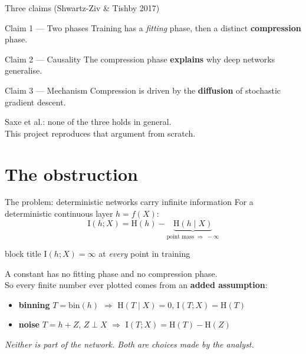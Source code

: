 \documentclass[aspectratio=169,11pt]{beamer}
\newcommand{\I}{\mathrm{I}}
\newcommand{\HH}{\mathrm{H}}
\begin{document}
\begin{frame}{Three claims (Shwartz-Ziv \& Tishby 2017)}
\begin{block}{Claim 1 --- Two phases}
Training has a \emph{fitting} phase, then a distinct \textbf{compression} phase.
\end{block}
\begin{block}{Claim 2 --- Causality}
The compression phase \textbf{explains} why deep networks generalise.
\end{block}
\begin{block}{Claim 3 --- Mechanism}
Compression is driven by the \textbf{diffusion} of stochastic gradient descent.
\end{block}
\bigskip
\begin{center}
\large Saxe et al.: \textcolor{bad}{none of the three holds in general.}\\[2pt]
\normalsize This project reproduces that argument from scratch.
\end{center}
\end{frame}

\section{The obstruction}

\begin{frame}{The problem: deterministic networks carry infinite information}
\label{slide:problem}
For a deterministic continuous layer $h = f(X)$:
\[ \I(h;X) = \HH(h) - \underbrace{\HH(h\mid X)}_{\text{point mass}\;\Rightarrow\;-\infty} \]
\begin{center}
\begin{beamercolorbox}[sep=6pt,center,rounded=true,shadow=true]{block title}
\Large $\I(h;X) = \infty$ \quad at \emph{every} point in training
\end{beamercolorbox}
\end{center}
\medskip
A constant has no fitting phase and no compression phase.\\[4pt]
So every finite number ever plotted comes from an \textbf{added assumption}:
\begin{itemize}
  \item \textbf{binning}\; $T=\mathrm{bin}(h)$ \;$\Rightarrow$\; $\HH(T\mid X)=0$,\; $\I(T;X)=\HH(T)$
  \item \textbf{noise}\; $T=h+Z$,\; $Z\perp X$ \;$\Rightarrow$\; $\I(T;X)=\HH(T)-\HH(Z)$
\end{itemize}
\bigskip
\centering\emph{Neither is part of the network. Both are choices made by the analyst.}
\end{frame}
\end{document}
